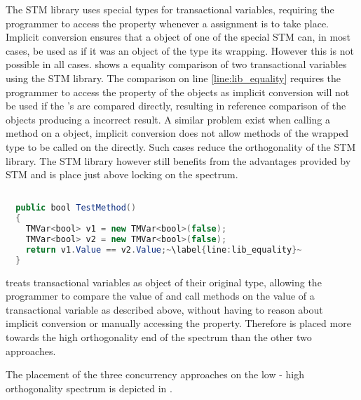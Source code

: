 The \ac{STM} library uses special types for transactional variables, requiring the programmer to access the  property whenever a assignment is to take place. Implicit conversion ensures that a object of one of the special \ac{STM} can, in most cases, be used as if it was an object of the type its wrapping. However this is not possible in all cases.  shows a equality comparison of two transactional variables using the \ac{STM} library. The comparison on line \ref{line:lib_equality} requires the programmer to access the  property of the  objects as implicit conversion will not be used if the 's are compared directly, resulting in reference comparison of the  objects producing a incorrect result. A similar problem exist when calling a method on a  object, implicit conversion does not allow methods of the wrapped type to be called on the  directly. Such cases reduce the orthogonality of the \ac{STM} library. The \ac{STM} library however still benefits from the advantages provided by \ac{STM} and is place just above locking on the spectrum.

\begin{lstlisting}[label=lst:lib_implicit_conversion,
  caption={Equality comparison of \bscode{TMVar<bool>}},
  language=Java,  
  showspaces=false,
  showtabs=false,
  breaklines=true,
  showstringspaces=false,
  breakatwhitespace=true,
  escapechar=~,
  commentstyle=\color{greencomments},
  keywordstyle=\color{bluekeywords},
  stringstyle=\color{redstrings},
  morekeywords={atomic, retry, orelse, var, get, set, ref, out, bool}]  % Start your code-block

  public bool TestMethod()
  {
    TMVar<bool> v1 = new TMVar<bool>(false);
    TMVar<bool> v2 = new TMVar<bool>(false);
    return v1.Value == v2.Value;~\label{line:lib_equality}~
  }
\end{lstlisting}
\stmnamesp treats transactional variables as object of their original type, allowing the programmer to compare the value of and call methods on  the value of a transactional variable as described above, without having to reason about implicit conversion or manually accessing the  property. Therefore \stmname is placed more towards the high orthogonality end of the spectrum than the other two approaches. 

The placement of the three concurrency approaches on the low - high orthogonality spectrum is depicted in .


